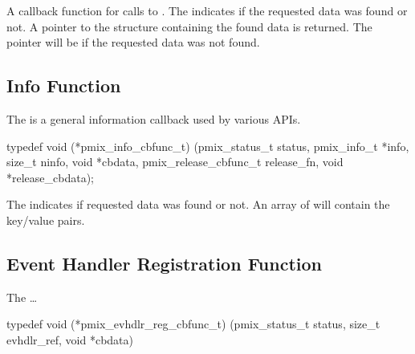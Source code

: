 \descr

A callback function for calls to .
The  indicates if the requested data was found or not.
A pointer to the  structure containing the found data is returned.
The pointer will be  if the requested data was not found.


\subsection{Info Function}

\summary

The  is a general information callback used by various APIs.

\cspecificstart
\begin{codepar}
typedef void (*pmix_info_cbfunc_t)
    (pmix_status_t status,
     pmix_info_t *info, size_t ninfo,
     void *cbdata,
     pmix_release_cbfunc_t release_fn,
     void *release_cbdata);
\end{codepar}
\cspecificend

\begin{arglist}
\end{arglist}


\descr

The  indicates if requested data was found or not.
An array of  will contain the key/value pairs.


\subsection{Event Handler Registration Function}

The  \ldots

\cspecificstart
\begin{codepar}
typedef void (*pmix_evhdlr_reg_cbfunc_t)
    (pmix_status_t status,
     size_t evhdlr_ref,
     void *cbdata)
\end{codepar}
\cspecificend

\begin{arglist}
\end{arglist}


